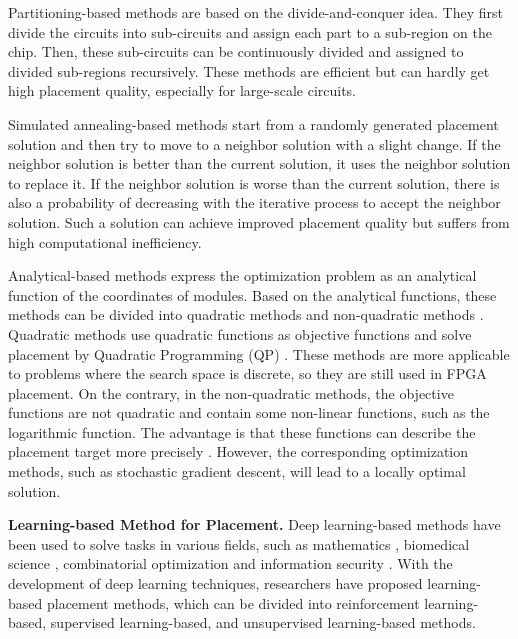 \documentclass{article}
\theoremstyle{plain}
\theoremstyle{definition}
\theoremstyle{remark}
\begin{document}
Partitioning-based methods \cite{roy2006min, khatkhate2004recursive} are based on the divide-and-conquer idea. They first divide the circuits into sub-circuits and assign each part to a sub-region on the chip. Then, these sub-circuits can be continuously divided and assigned to divided sub-regions recursively. These methods are efficient but can hardly get high placement quality, especially for large-scale circuits.

Simulated annealing-based methods \cite{yang2000dragon2000, vashisht2020placement} start from a randomly generated placement solution and then try to move to a neighbor solution with a slight change. If the neighbor solution is better than the current solution, it uses the neighbor solution to replace it. If the neighbor solution is worse than the current solution, there is also a probability of decreasing with the iterative process to accept the neighbor solution. Such a solution can achieve improved placement quality but suffers from high computational inefficiency.

Analytical-based methods express the optimization problem as an analytical function of the coordinates of modules. Based on the analytical functions, these methods can be divided into quadratic methods \cite{viswanathan2007rql, viswanathan2007fastplace, kim2012maple, kim2012complx, brenner2015bonnplace, lin2013polar, spindler2008kraftwerk2} and non-quadratic methods \cite{chen2008ntuplace3, lu2014eplace, cheng2018replace, lin2020dreamplace, chan2006mpl6, kahng2005aplace,  gu2020dreamplace}. Quadratic methods use quadratic functions as objective functions and solve placement by Quadratic Programming (QP) \cite{nocedal2006quadratic}. These methods are more applicable to problems where the search space is discrete, so they are still used in FPGA placement. On the contrary, in the non-quadratic methods, the objective functions are not quadratic and contain some non-linear functions, such as the logarithmic function. The advantage is that these functions can describe the placement target more precisely \cite{cheng2018replace, lu2014eplace}. However, the corresponding optimization methods, such as stochastic gradient descent, will lead to a locally optimal solution. 

\textbf{Learning-based Method for Placement.} 
Deep learning-based methods \cite{wang2022sample,wang2023efficient} have been used to solve tasks in various fields, such as mathematics \cite{davies2021advancing}, biomedical science \cite{jumper2021highly}, combinatorial optimization \cite{wang2022learning} and information security \cite{lai2020opensmax}.
With the development of deep learning techniques, researchers have proposed learning-based placement methods, which can be divided into reinforcement learning-based, supervised learning-based, and unsupervised learning-based methods.
\end{document}
